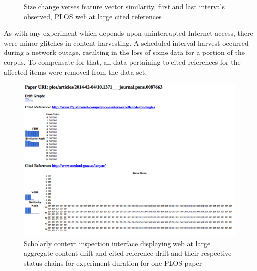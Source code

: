 \documentclass[12pt]{article}
\begin{document}
\begin{figure}[ht!]
  \centering
  \hfill
  \caption{Size change verses feature vector similarity, first and last intervals observed, PLOS web at large cited references}
\end{figure}

As with any experiment which depends upon uninterrupted Internet access, there were minor glitches in content harvesting. A scheduled interval harvest occurred during a network outage, resulting in the loss of some data for a portion of the corpus. To compensate for that, all data pertaining to cited references for the affected items were removed from the data set. 

\begin{figure}[ht!]
  \includegraphics[width=\linewidth,natwidth=610,natheight=642]{figure6.png}
  \caption{Scholarly context inspection interface displaying web at large aggregate content drift and cited reference drift and their respective status chains for experiment duration for one PLOS paper}
  \label{fig:contextinspec}
\end{figure}
\end{document}
